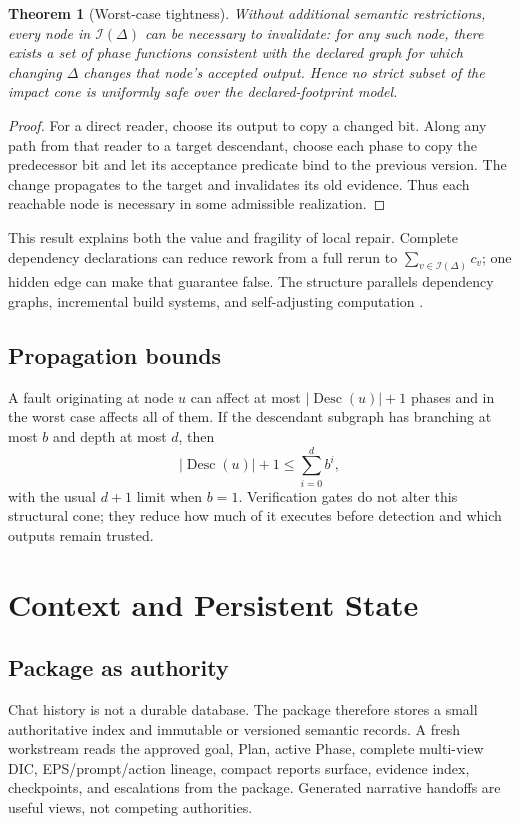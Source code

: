 \documentclass[11pt,a4paper]{article}
\newtheorem{theorem}[definition]{Theorem}
\newcommand{\Desc}{\operatorname{Desc}}
\begin{document}
\begin{theorem}[Worst-case tightness]
\label{thm:tight}
Without additional semantic restrictions, every node in $\mathcal I(\Delta)$ can be necessary to invalidate: for any such node, there exists a set of phase functions consistent with the declared graph for which changing $\Delta$ changes that node's accepted output. Hence no strict subset of the impact cone is uniformly safe over the declared-footprint model.
\end{theorem}
\begin{proof}
For a direct reader, choose its output to copy a changed bit. Along any path from that reader to a target descendant, choose each phase to copy the predecessor bit and let its acceptance predicate bind to the previous version. The change propagates to the target and invalidates its old evidence. Thus each reachable node is necessary in some admissible realization.
\end{proof}
This result explains both the value and fragility of local repair. Complete dependency declarations can reduce rework from a full rerun to $\sum_{v\in\mathcal I(\Delta)}c_v$; one hidden edge can make that guarantee false. The structure parallels dependency graphs, incremental build systems, and self-adjusting computation \cite{mckinley1994programdependence,mokhov2018build,acar2009selfadjusting}.

\subsection{Propagation bounds}
A fault originating at node $u$ can affect at most $|\Desc(u)|+1$ phases and in the worst case affects all of them. If the descendant subgraph has branching at most $b$ and depth at most $d$, then
\[
|\Desc(u)|+1\le \sum_{i=0}^{d}b^i,
\]
with the usual $d+1$ limit when $b=1$. Verification gates do not alter this structural cone; they reduce how much of it executes before detection and which outputs remain trusted.

\section{Context and Persistent State}
\subsection{Package as authority}
Chat history is not a durable database. The package therefore stores a small authoritative index and immutable or versioned semantic records. A fresh workstream reads the approved goal, Plan, active Phase, complete multi-view DIC, EPS/prompt/action lineage, compact reports surface, evidence index, checkpoints, and escalations from the package. Generated narrative handoffs are useful views, not competing authorities.
\end{document}
